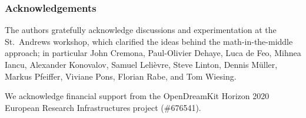 \documentclass{llncs}
\begin{document}
\subsubsection*{Acknowledgements}
The authors gratefully acknowledge discussions and experimentation at the St.\ Andrews
workshop, which clarified the ideas behind the math-in-the-middle approach;
in particular John Cremona, Paul-Olivier Dehaye, Luca de Feo, Mihnea Iancu, Alexander
Konovalov, Samuel Leli\`evre, Steve Linton, Dennis M\"uller, Markus Pfeiffer, Viviane Pons,
Florian Rabe, and Tom Wiesing.

We acknowledge financial support from the OpenDreamKit Horizon 2020 European Research
Infrastructures project (\#676541).

\printbibliography
\end{document}
